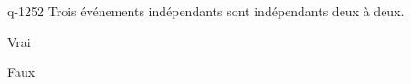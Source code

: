 \begin{truefalse}{q-1252}
Trois événements indépendants sont indépendants deux à deux. 
\item* Vrai
\item Faux
\end{truefalse}

